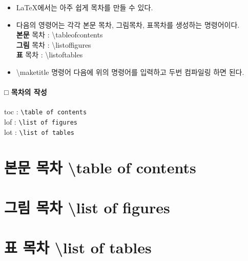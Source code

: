 \documentclass[12pt, a4paper, oneside]{book}
\let\stdsection\section
\renewcommand\section{\newpage\stdsection}
\begin{document}
			\begin{itemize}[topsep=0.0em, parsep=0.0em, itemsep=0em, leftmargin=6.0em, labelwidth=3em, labelsep=3em] 
			\item 	LaTeX에서는 아주 쉽게 목차를 만들 수 있다.
			\item 	다음의 영령어는 각각 본문 목차, 그림목차, 표목차를 생성하는 명령어이다. \\
					\textbf{본문} 목차 : \textbackslash tableofcontents \\
					\textbf{그림} 목차 : \textbackslash listoffigures \\
					\textbf{표} 목차 	: \textbackslash listoftables 
			\item 	\textbackslash maketitle 명령어 다음에 위의 명령어를 입력하고 두번 컴파일링 하면 된다.
			
			
			\end{itemize}
	
	
		\paragraph{□  목차의 작성} \tab
			\begin{framed}
			toc : \verb|\table of contents| \\
			lof : \verb|\list of figures| \\
			lot : \verb|\list of tables|
			\end{framed} 



	\newpage  \null
	\section{본문 목차 \textbackslash table of contents}


	
	\newpage  \null
	\section{그림 목차 \textbackslash list of figures}


	\newpage  \null
	\section{표 목차 \textbackslash list of tables}
\end{document}
